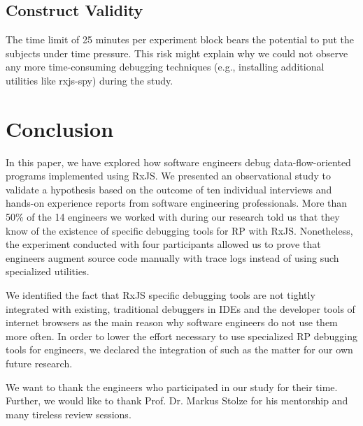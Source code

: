 \documentclass[sigplan,screen,review]{acmart}
\begin{document}
\subsection{Construct Validity}

The time limit of 25 minutes per experiment block bears the potential to put the subjects under time pressure. This risk might explain why we could not observe any more time-consuming debugging techniques (e.g., installing additional utilities like rxjs-spy) during the study.


\section{Conclusion}
\label{sec:conclusion}

In this paper, we have explored how software engineers debug data-flow-oriented programs implemented using RxJS. We presented an observational study to validate a hypothesis based on the outcome of ten individual interviews and hands-on experience reports from software engineering professionals. More than 50\% of the 14 engineers we worked with during our research told us that they know of the existence of specific debugging tools for RP with RxJS. Nonetheless, the experiment conducted with four participants allowed us to prove that engineers augment source code manually with trace logs instead of using such specialized utilities.

We identified the fact that RxJS specific debugging tools are not tightly integrated with existing, traditional debuggers in IDEs and the developer tools of internet browsers as the main reason why software engineers do not use them more often. In order to lower the effort necessary to use specialized RP debugging tools for engineers, we declared the integration of such as the matter for our own future research.

\begin{acks}
	We want to thank the engineers who participated in our study for their time. Further, we would like to thank Prof. Dr. Markus Stolze for his mentorship and many tireless review sessions.
\end{acks}



\end{document}
